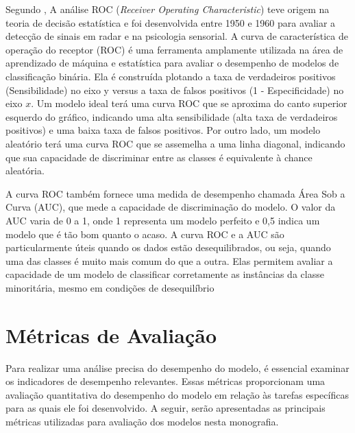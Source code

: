 \documentclass[12pt,oneside,a4paper,chapter=TITLE,
			   english,brazil]{abntex2}
\begin{document}
Segundo ,  A análise ROC (\textit{Receiver Operating Characteristic}) teve origem na teoria de decisão estatística e foi desenvolvida entre 1950 e 1960 para avaliar a detecção de sinais em radar e na psicologia sensorial.
A curva de característica de operação do receptor (ROC) é uma ferramenta amplamente utilizada na área de aprendizado de máquina e estatística para avaliar o desempenho de modelos de classificação binária. Ela é construída plotando a taxa de verdadeiros positivos (Sensibilidade) no eixo y versus a taxa de falsos positivos (1 - Especificidade) no eixo $x$.  Um modelo ideal terá uma curva ROC que se aproxima do canto superior esquerdo do gráfico, indicando uma alta sensibilidade (alta taxa de verdadeiros positivos) e uma baixa taxa de falsos positivos. Por outro lado, um modelo aleatório terá uma curva ROC que se assemelha a uma linha diagonal, indicando que sua capacidade de discriminar entre as classes é equivalente à chance aleatória.

A curva ROC também fornece uma medida de desempenho chamada Área Sob a Curva (AUC), que mede a capacidade de discriminação do modelo. O valor da AUC varia de 0 a 1, onde 1 representa um modelo perfeito e 0,5 indica um modelo que é tão bom quanto o acaso.  A curva ROC e a AUC são particularmente úteis quando os dados estão desequilibrados, ou seja, quando uma das classes é muito mais comum do que a outra. Elas permitem avaliar a capacidade de um modelo de classificar corretamente as instâncias da classe minoritária, mesmo em condições de desequilíbrio


\vspace{\onelineskip}
\section{Métricas de Avaliação}
\vspace{\onelineskip}

Para realizar uma análise precisa do desempenho do modelo, é essencial examinar os indicadores de desempenho relevantes. Essas métricas proporcionam uma avaliação quantitativa do desempenho do modelo em relação às tarefas específicas para as quais ele foi desenvolvido. A seguir, serão apresentadas as principais métricas utilizadas para avaliação dos modelos nesta monografia.
\end{document}
